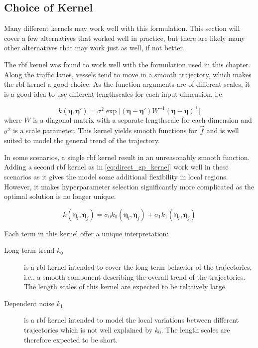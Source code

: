 \subsection{Choice of Kernel}
Many different kernels may work well with this formulation. This section will cover a few alternatives that worked well in practice, but there are likely many other alternatives that may work just as well, if not better. 

The \acrshort{rbf} kernel was found to work well with the formulation used in this chapter. Along the traffic lanes, vessels tend to move in a smooth trajectory, which makes the \acrshort{rbf} kernel a good choice. As the function arguments are of different scales, it is a good idea to use different lengthscales for each input dimension, i.e.

\begin{equation}
    k(\boldsymbol{\eta}, \boldsymbol{\eta}') = \sigma^2 \exp \big[ (\boldsymbol{\eta} - \boldsymbol{\eta}') W^{-1} (\boldsymbol{\eta} - \boldsymbol{\eta})^\intercal \big]
\end{equation}
where $W$ is a diagonal matrix with a separate lengthscale for each dimension and $\sigma^2$ is a scale parameter. This kernel yields smooth functions for $\vec{f}$ and is well suited to model the general trend of the trajectory.

In some scenarios, a single \acrshort{rbf} kernel result in an unreasonably smooth function. Adding a second \acrshort{rbf} kernel as in \cref{eq:direct_gp_kernel} work well in these scenarios as it gives the model some additional flexibility in local regions. However, it makes hyperparameter selection significantly more complicated as the optimal solution is no longer unique.  

\begin{equation}\label{eq:direct_gp_kernel}
    k(\boldsymbol{\eta}_i, \boldsymbol{\eta}_j) = \sigma_0 k_0(\boldsymbol{\eta}_i, \boldsymbol{\eta}_j) + \sigma_1 k_1(\boldsymbol{\eta}_i, \boldsymbol{\eta}_j)
\end{equation}

Each term in this kernel offer a unique interpretation:
\begin{description}
    \item[Long term trend $k_0$] is a \acrshort{rbf} kernel intended to cover the long-term behavior of the trajectories, i.e., a smooth component describing the overall trend of the trajectories. The length scales of this kernel are expected to be relatively large.
    \item[Dependent noise $k_1$] is a \acrshort{rbf} kernel intended to model the local variations between different trajectories which is not well explained by $k_0$. The length scales are therefore expected to be short.
\end{description}


